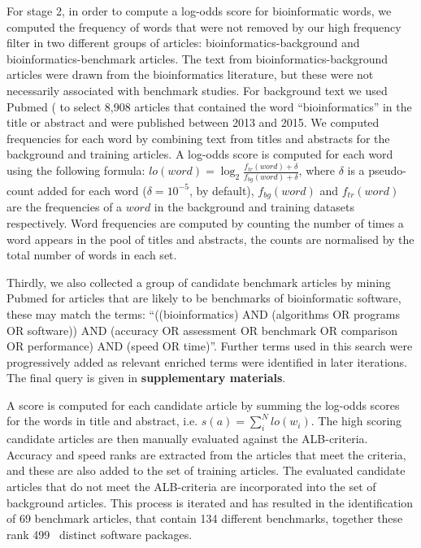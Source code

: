 \documentclass[fleqn,10pt]{SelfArx} %
\def\numTools{499}
\def\numBenchmarkPubs{69}
\def\numBenchmarks{134}
\begin{document}
For stage 2, in order to compute a log-odds score for bioinformatic
words, we computed the frequency of words that were not removed by our
high frequency filter in two different groups of articles:
bioinformatics-background and bioinformatics-benchmark articles. The
text from bioinformatics-background articles were drawn from the
bioinformatics literature, but these were not necessarily associated
with benchmark studies. For background text we used Pubmed
(\cite{Sayers2010-vm,McEntyre2001-fl} to select 8,908 articles that
contained the word “bioinformatics” in the title or abstract and were
published between 2013 and 2015. We computed frequencies for each word
by combining text from titles and abstracts for the background and
training articles. A log-odds score is computed for each word using
the following formula:
$lo(word)=\log_2\frac{f_{tr}(word)+\delta}{f_{bg}(word)+\delta}$, where
$\delta$
is a pseudo-count added for each word ($\delta = 10^{-5}$, by default),
$f_{bg}(word)$ and $f_{tr}(word)$ are the frequencies of a $word$ in
the background and training datasets respectively. Word frequencies
are computed by counting the number of times a word appears in the
pool of titles and abstracts, the counts are normalised by the total
number of words in each set.

Thirdly, we also collected a group of candidate benchmark articles by
mining Pubmed for articles that are likely to be benchmarks of
bioinformatic software, these may match the terms: “((bioinformatics)
AND (algorithms OR programs OR software)) AND (accuracy OR assessment
OR benchmark OR comparison OR performance) AND (speed OR
time)”. Further terms used in this search were progressively added as
relevant enriched terms were identified in later iterations. The final
query is given in \textbf{supplementary materials}.

A score is computed for each candidate article by summing the log-odds
scores for the words in title and abstract,
i.e. $s(a)=\sum_i^Nlo(w_i)$. The high scoring candidate articles are
then manually evaluated against the ALB-criteria. Accuracy and speed
ranks are extracted from the articles that meet the criteria, and
these are also added to the set of training articles. The evaluated
candidate articles that do not meet the ALB-criteria are incorporated
into the set of background articles. This process is iterated and has resulted in the identification of
{\color{black}\numBenchmarkPubs} benchmark articles, that
contain {\color{black}\numBenchmarks} different benchmarks, together these
rank {\color{black}\numTools~} distinct software packages.
\end{document}
